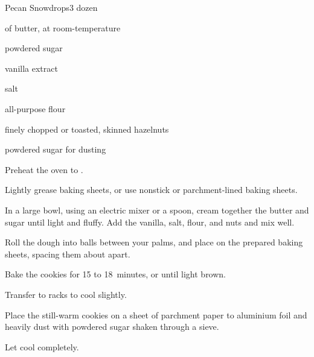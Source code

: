 \begin{recipe}{Pecan Snowdrops}{}{3 dozen}

\begin{ingredients}
\item \C{\threequarter} of butter, at room-temperature
\item \C{\third} powdered sugar
\item {} vanilla extract
\item \tp{\eighth} salt
\item \C{1 \half} all-purpose flour
\item \C{\threequarter} finely chopped  or toasted, skinned hazelnuts
\item powdered sugar for dusting
\end{ingredients}

\begin{directions}
\item Preheat the oven to .
\item Lightly grease baking sheets, or use nonstick or parchment-lined baking sheets.
\item In a large bowl, using an electric mixer or a spoon, cream together the butter and sugar until light and fluffy.  Add the vanilla, salt, flour, and nuts and mix well.
\item Roll the dough into \inch{\threequarter} balls between your palms, and place on the prepared baking sheets, spacing them about \inch{1 \half} apart.
\item Bake the cookies for 15 to 18~minutes, or until light brown.
\item Transfer to racks to cool slightly.
\item Place the still-warm cookies on a sheet of parchment paper to aluminium foil and heavily dust with powdered sugar shaken through a sieve.
\item Let cool completely.
\end{directions}

\end{recipe}
